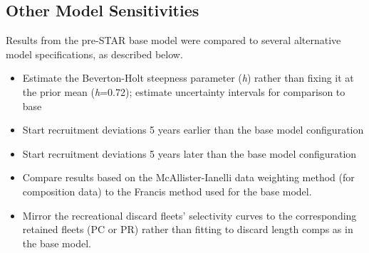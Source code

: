 \documentclass[11pt,
  english,
  a4paper,
]{article}
\begin{document}

\hypertarget{other-model-sensitivities}{%
\subsection{Other Model Sensitivities}\label{other-model-sensitivities}}

\leavevmode\tagmcend\tagstructend

Results from the pre-STAR base model were compared to several alternative model specifications, as described below.


\begin{itemize}
\item

  Estimate the Beverton-Holt steepness parameter (\emph{h}) rather than fixing it at the prior mean (\emph{h}=0.72); estimate uncertainty intervals for comparison to base

  \tagmcend\tagstructend\tagstructend
\item

  Start recruitment deviations 5 years earlier than the base model configuration

  \tagmcend\tagstructend\tagstructend
\item

  Start recruitment deviations 5 years later than the base model configuration

  \tagmcend\tagstructend\tagstructend
\item

  Compare results based on the McAllister-Ianelli data weighting method (for composition data) to the Francis method used for the base model.

  \tagmcend\tagstructend\tagstructend
\item

  Mirror the recreational discard fleets' selectivity curves to the corresponding retained fleets (PC or PR) rather than fitting to discard length comps as in the base model.

  \tagmcend\tagstructend\tagstructend
\end{itemize}
\end{document}
